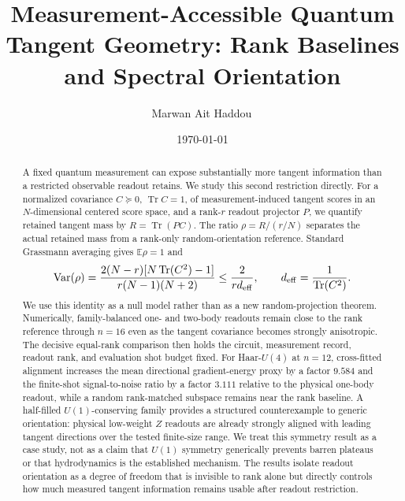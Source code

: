 \documentclass[aps,pra,reprint,superscriptaddress,nofootinbib,longbibliography]{revtex4-2}
\newcommand{\Tr}{\operatorname{Tr}}
\newcommand{\deff}{d_{\rm eff}}
\begin{document}

\title{Measurement-Accessible Quantum Tangent Geometry: Rank Baselines and Spectral Orientation}

\author{Marwan Ait Haddou\,}
\date{\today}

\begin{abstract}
A fixed quantum measurement can expose substantially more tangent information than a restricted observable readout retains. We study this second restriction directly. For a normalized covariance $C\succeq0$, $\Tr C=1$, of measurement-induced tangent scores in an $N$-dimensional centered score space, and a rank-$r$ readout projector $P$, we quantify retained tangent mass by $R=\Tr(PC)$. The ratio $\rho=R/(r/N)$ separates the actual retained mass from a rank-only random-orientation reference. Standard Grassmann averaging gives $\mathbb{E}\rho=1$ and
\begin{equation*}
\mathrm{Var}(\rho)=\frac{2(N-r)[N\Tr(C^2)-1]}{r(N-1)(N+2)}
\le \frac{2}{r\deff},
\qquad \deff=\frac{1}{\Tr(C^2)}.
\end{equation*}
We use this identity as a null model rather than as a new random-projection theorem. Numerically, family-balanced one- and two-body readouts remain close to the rank reference through $n=16$ even as the tangent covariance becomes strongly anisotropic. The decisive equal-rank comparison then holds the circuit, measurement record, readout rank, and evaluation shot budget fixed. For Haar-$U(4)$ at $n=12$, cross-fitted alignment increases the mean directional gradient-energy proxy by a factor $9.584$ and the finite-shot signal-to-noise ratio by a factor $3.111$ relative to the physical one-body readout, while a random rank-matched subspace remains near the rank baseline. A half-filled $U(1)$-conserving family provides a structured counterexample to generic orientation: physical low-weight $Z$ readouts are already strongly aligned with leading tangent directions over the tested finite-size range. We treat this symmetry result as a case study, not as a claim that $U(1)$ symmetry generically prevents barren plateaus or that hydrodynamics is the established mechanism. The results isolate readout orientation as a degree of freedom that is invisible to rank alone but directly controls how much measured tangent information remains usable after readout restriction.
\end{abstract}
\end{document}
